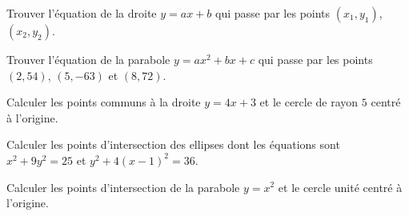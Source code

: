 
\begin{exercice}
Trouver l'équation de la droite $y=ax+b$ qui passe par les points
$(x_1,y_1)$, $(x_2,y_2)$.
\end{exercice}

\begin{exercice}
Trouver l'équation de la parabole $y=ax^2+bx+c$ qui passe par les points
$(2,54)$, $(5,-63)$ et $(8,72)$.
\end{exercice}

\begin{exercice}
Calculer les points communs à la droite $y=4x+3$ et le cercle de rayon $5$
centré à l'origine.
\end{exercice}

\begin{exercice}
Calculer les points d'intersection des ellipses dont les équations sont
$x^{2} + 9 y^{2} = 25$ et $y^{2} + 4 \left(x - 1\right)^{2} = 36$.
\end{exercice}

\begin{exercice}
Calculer les points d'intersection de la parabole $y=x^2$ et le cercle unité
centré à l'origine.
\end{exercice}







